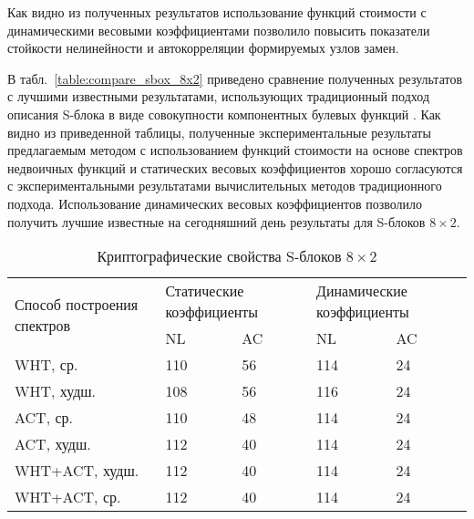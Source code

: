 Как видно из полученных результатов использование функций стоимости с
динамическими весовыми коэффициентами позволило повысить показатели стойкости
нелинейности и автокорреляции формируемых узлов замен. 

В табл.~\ref{table:compare_sbox_8x2} приведено сравнение полученных результатов с лучшими
известными результатами, использующих традиционный подход описания S-блока в
виде совокупности компонентных булевых функций
\cite{Millian1,Millian2,Clark1,Laskari,Tesar}.  Как видно из приведенной
таблицы, полученные экспериментальные результаты предлагаемым методом с
использованием функций стоимости на основе спектров недвоичных функций и
статических весовых коэффициентов хорошо согласуются с экспериментальными
результатами вычислительных методов традиционного подхода.  Использование
динамических весовых коэффициентов позволило получить лучшие известные на
сегодняшний день результаты для S-блоков $8 \times 2$.

\begin{table}[ht]
    \caption{Криптографические свойства S-блоков $8 \times 2$}
    \label{table:sbox_8x2}
    \begin{tabular}{| m{5.75cm} | m{1cm} | m{1cm} | m{1cm} | m{1cm} |}
        \hline
        \multirow{2}{*}{\vbox{Способ построения спектров}} &
        \multicolumn{2}{m{5cm}}{Статические коэффициенты} &
        \multicolumn{2}{|m{5cm}|}{Динамические коэффициенты} \\ \cline{2-5}
                        & NL    & AC    & NL    & AC \\ \hline
        WHT, ср.        & 110   & 56    & 114   & 24 \\ \hline
        WHT, худш.      & 108   & 56    & 116   & 24 \\ \hline
        ACT, ср.        & 110   & 48    & 114   & 24 \\ \hline
        ACT, худш.      & 112   & 40    & 114   & 24 \\ \hline
        WHT+ACT, худш.  & 112   & 40    & 114   & 24 \\ \hline
        WHT+ACT, ср.    & 112   & 40    & 114   & 24 \\ \hline
    \end{tabular}
\end{table}

